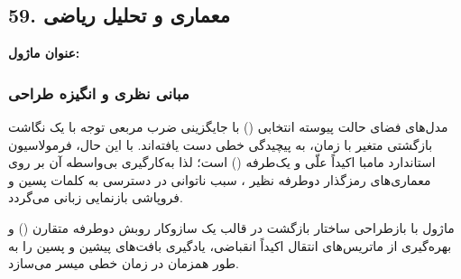 \subsection*{59. معماری و تحلیل ریاضی }
\textbf{عنوان ماژول:} 

\subsubsection*{مبانی نظری و انگیزه طراحی}
مدل‌های فضای حالت پیوسته انتخابی () با جایگزینی ضرب مربعی توجه با یک نگاشت بازگشتی متغیر با زمان، به پیچیدگی خطی دست یافته‌اند. با این حال، فرمولاسیون استاندارد مامبا اکیداً علّی و یک‌طرفه () است؛ لذا به‌کارگیری بی‌واسطه آن بر روی معماری‌های رمزگذار دوطرفه نظیر ، سبب ناتوانی در دسترسی به کلمات پسین و فروپاشی بازنمایی زبانی می‌گردد.

ماژول  با بازطراحی ساختار بازگشت در قالب یک سازوکار روبش دوطرفه متقارن () و بهره‌گیری از ماتریس‌های انتقال اکیداً انقباضی، یادگیری بافت‌های پیشین و پسین را به طور همزمان در زمان خطی میسر می‌سازد.

